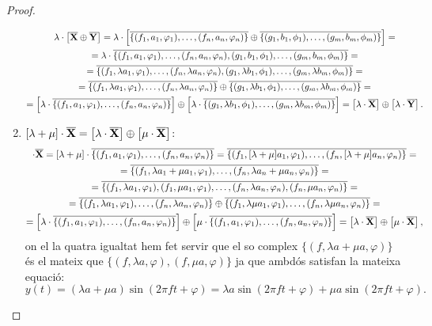 \documentclass{article}
\theoremstyle{definition}
\newcommand{\0}{\ensuremath{\vb{0}}}
\newcommand{\X}{\ensuremath{\vb{X}}}
\newcommand{\Y}{\ensuremath{\vb{Y}}}
\begin{document}
\begin{proof}
\begin{enumerate}
\begin{multline*}
            \lambda\cdot\left[\overline{\X}\oplus \overline{\Y}\right]=\lambda\cdot\left[\overline{\{(f_1,a_1,\varphi_1),\ldots,(f_n,a_n,\varphi_n)\}}\oplus\overline{\{(g_1,b_1,\phi_1),\ldots,(g_m,b_m,\phi_m)\}}\right]=\\=\lambda\cdot\overline{\{(f_1, a_1,\varphi_1),\ldots,(f_n, a_n,\varphi_n),(g_1,b_1,\phi_1),\ldots,(g_m,b_m,\phi_m)\}}=\\=\overline{\{(f_1,\lambda a_1,\varphi_1),\ldots,(f_n,\lambda a_n,\varphi_n),(g_1,\lambda b_1,\phi_1),\ldots,(g_m,\lambda b_m,\phi_m)\}}=\\=\overline{\{(f_1,\lambda a_1,\varphi_1),\ldots,(f_n,\lambda a_n,\varphi_n)\}}\oplus\overline{\{(g_1,\lambda b_1,\phi_1),\ldots,(g_m,\lambda b_m,\phi_m)\}}=\\=\left[\lambda\cdot\overline{\{(f_1,a_1,\varphi_1),\ldots,(f_n,a_n,\varphi_n)\}}\right]\oplus\left[\lambda\cdot\overline{\{(g_1,\lambda b_1,\phi_1),\ldots,(g_m,\lambda b_m,\phi_m)\}}\right]=\left[\lambda\cdot \overline{\X}\right]\oplus\left[\lambda\cdot \overline{\Y}\right].
        \end{multline*}
        \item $[\lambda+\mu]\cdot \overline{\X}=\left[\lambda \cdot \overline{\X}\right] \oplus\left[\mu \cdot \overline{\X}\right]$:
        \begin{multline*}
            [\lambda+\mu]\cdot \overline{\X}=[\lambda+\mu]\cdot\overline{\{(f_1,a_1,\varphi_1),\ldots,(f_n,a_n,\varphi_n)\}}=\overline{\{(f_1,[\lambda+\mu]a_1,\varphi_1),\ldots,(f_n,[\lambda+\mu]a_n,\varphi_n)\}}=\\=\overline{\{(f_1,\lambda a_1+\mu a_1,\varphi_1),\ldots,(f_n,\lambda a_n+\mu a_n,\varphi_n)\}}=\\=\overline{\{(f_1,\lambda a_1,\varphi_1),(f_1,\mu a_1,\varphi_1),\ldots,(f_n,\lambda a_n,\varphi_n),(f_n,\mu a_n,\varphi_n)\}}=\\=\overline{\{(f_1,\lambda a_1,\varphi_1),\ldots,(f_n,\lambda a_n,\varphi_n)\}}\oplus\overline{\{(f_1,\lambda\mu a_1,\varphi_1),\ldots,(f_n,\lambda\mu a_n,\varphi_n)\}}=\\=\left[\lambda\cdot\overline{\{(f_1,a_1,\varphi_1),\ldots,(f_n,a_n,\varphi_n)\}}\right]\oplus\left[\mu\cdot\overline{\{(f_1,a_1,\varphi_1),\ldots,(f_n,a_n,\varphi_n)\}}\right]=\left[\lambda \cdot \overline{\X}\right] \oplus\left[\mu \cdot \overline{\X}\right],
        \end{multline*}
        on el la quatra igualtat hem fet servir que el so complex $\{(f,\lambda a+\mu a,\varphi)\}$ és el mateix que $\{(f,\lambda a,\varphi),(f,\mu a,\varphi)\}$ ja que ambdós satisfan la mateixa equació: $$y(t)=(\lambda a+\mu a)\sin(2\pi ft+\varphi)=\lambda a\sin(2\pi ft+\varphi)+\mu a\sin(2\pi ft+\varphi).$$
    \end{enumerate}
\end{proof}
\end{document}

